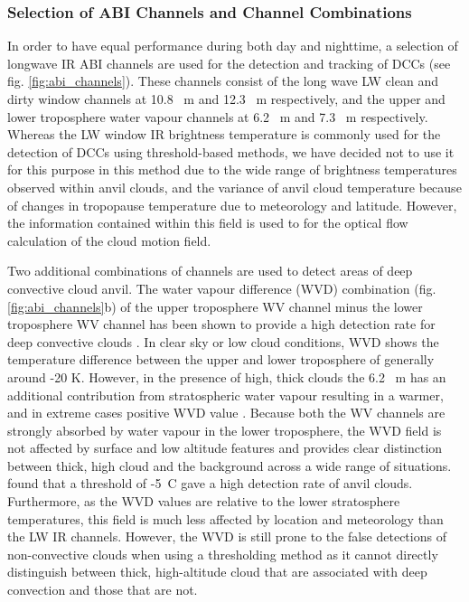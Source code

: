\subsubsection{Selection of ABI Channels and Channel Combinations}

In order to have equal performance during both day and nighttime, a selection of longwave IR ABI channels are used for the detection and tracking of DCCs (see fig. \ref{fig:abi_channels}). 
These channels consist of the long wave LW clean and dirty window channels at 10.8 \unit{\mu m} and 12.3 \unit{\mu m} respectively, and the upper and lower troposphere water vapour channels at 6.2 \unit{\mu m} and 7.3 \unit{\mu m} respectively.
Whereas the LW window IR brightness temperature is commonly used for the detection of DCCs using threshold-based methods, we have decided not to use it for this purpose in this method due to the wide range of brightness temperatures observed within anvil clouds, and the variance of anvil cloud temperature because of changes in tropopause temperature due to meteorology and latitude.
However, the information contained within this field is used to for the optical flow calculation of the cloud motion field.

Two additional combinations of channels are used to detect areas of deep convective cloud anvil. 
The water vapour difference (WVD) combination (fig. \ref{fig:abi_channels}b) of the upper troposphere WV channel minus the lower troposphere WV channel has been shown to provide a high detection rate for deep convective clouds \citep{muller_role_2018, muller_novel_2019}.
In clear sky or low cloud conditions, WVD shows the temperature difference between the upper and lower troposphere of generally around -20 K. 
However, in the presence of high, thick clouds the 6.2 \unit{\mu m} has an additional contribution from stratospheric water vapour resulting in a warmer, and in extreme cases positive WVD value \citep{schmetz_monitoring_1997}.
Because both the WV channels are strongly absorbed by water vapour in the lower troposphere, the WVD field is not affected by surface and low altitude features and provides clear distinction between thick, high cloud and the background across a wide range of situations.
\citet{muller_novel_2019} found that a threshold of -5~\textdegree C gave a high detection rate of anvil clouds.
Furthermore, as the WVD values are relative to the lower stratosphere temperatures, this field is much less affected by location and meteorology than the LW IR channels.
However, the WVD is still prone to the false detections of non-convective clouds when using a thresholding method as it cannot directly distinguish between thick, high-altitude cloud that are associated with deep convection and those that are not.


